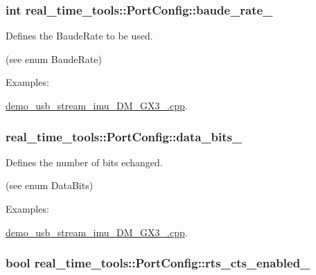 \subsubsection[{\texorpdfstring{baude\+\_\+rate\+\_\+}{baude_rate_}}]{\setlength{\rightskip}{0pt plus 5cm}int real\+\_\+time\+\_\+tools\+::\+Port\+Config\+::baude\+\_\+rate\+\_\+}\hypertarget{classreal__time__tools_1_1PortConfig_aa0be2d74f3ac70e9f43d36fc0c70901a}{}\label{classreal__time__tools_1_1PortConfig_aa0be2d74f3ac70e9f43d36fc0c70901a}


Defines the Baude\+Rate to be used. 

(see enum Baude\+Rate) \begin{Desc}
\item[Examples\+: ]\par
\hyperlink{demo_usb_stream_imu_3DM_GX3_25_8cpp-example}{demo\+\_\+usb\+\_\+stream\+\_\+imu\+\_\+D\+M\+\_\+\+G\+X3\+\_.\+cpp}.\end{Desc}
\subsubsection[{\texorpdfstring{data\+\_\+bits\+\_\+}{data_bits_}}]{ real\+\_\+time\+\_\+tools\+::\+Port\+Config\+::data\+\_\+bits\+\_\+}\hypertarget{classreal__time__tools_1_1PortConfig_af80f9991e3811392385208a9baf9c6fd}{}\label{classreal__time__tools_1_1PortConfig_af80f9991e3811392385208a9baf9c6fd}


Defines the number of bits echanged. 

(see enum Data\+Bits) \begin{Desc}
\item[Examples\+: ]\par
\hyperlink{demo_usb_stream_imu_3DM_GX3_25_8cpp-example}{demo\+\_\+usb\+\_\+stream\+\_\+imu\+\_\+D\+M\+\_\+\+G\+X3\+\_.\+cpp}.\end{Desc}
\subsubsection[{\texorpdfstring{rts\+\_\+cts\+\_\+enabled\+\_\+}{rts_cts_enabled_}}]{\setlength{\rightskip}{0pt plus 5cm}bool real\+\_\+time\+\_\+tools\+::\+Port\+Config\+::rts\+\_\+cts\+\_\+enabled\+\_\+}\hypertarget{classreal__time__tools_1_1PortConfig_ad89a20459faf7718a63ea8c00ddc5e34}{}\label{classreal__time__tools_1_1PortConfig_ad89a20459faf7718a63ea8c00ddc5e34}


